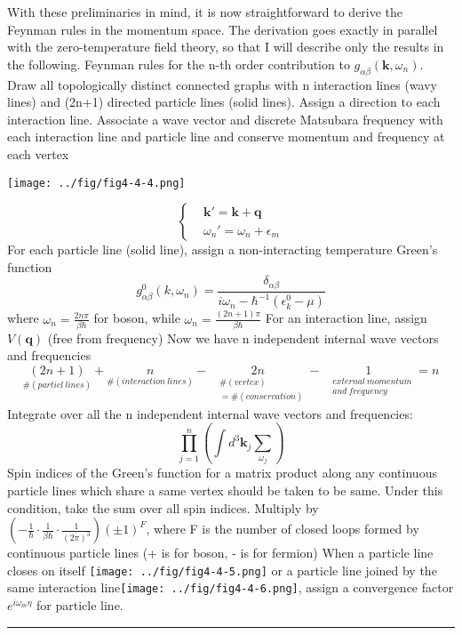 With these preliminaries in mind, it is now straightforward to derive the Feynman rules in the momentum space.
The derivation goes exactly in parallel with the zero-temperature field theory, so that I will describe only the results in the following.
Feynman rules for the n-th order contribution to $g_{\alpha\beta}(\mathbf{k},\omega_n)$.
Draw all topologically distinct connected graphs with n interaction lines (wavy lines) and (2n+1) directed particle lines (solid lines).
Assign a direction to each interaction line. Associate a wave vector and discrete Matsubara frequency with each interaction line and particle line and conserve momentum and frequency at each vertex\\
\begin{center}
\texttt{[image: ../fig/fig4-4-4.png]}
\end{center}
$$
\left\{
\begin{aligned}
&\mathbf{k}'=\mathbf{k}+\mathbf{q}\\
&\omega_n'=\omega_n+\epsilon_m
\end{aligned}
\right.
$$
For each particle line (solid line), assign a non-interacting temperature Green's function
\[
g_{\alpha\beta}^0(\mathbf{}k,\omega_n)=\frac{\delta_{\alpha\beta}}{i\omega_n-\hbar^{-1}(\epsilon_k^0-\mu)}
\]
where $\omega_n=\frac{2n\pi}{\beta\hbar}$ for boson, while $\omega_n=\frac{(2n+1)\pi}{\beta\hbar}$
For an interaction line, assign $V(\mathbf{q})$ (free from frequency)
Now we have n independent internal wave vectors and frequencies
\[
\underset{\#(particl\ lines)}{(2n+1)}+\underset{\#(interaction\ lines)}{n}-\underset{\begin{aligned}&\#(vertex)\\&=\#(conservation)\end{aligned}}{2n}-\underset{\begin{aligned}&external\ momentum\\&and\ frequency\end{aligned}}{1}=n
\]
Integrate over all the n independent internal wave vectors and frequencies:
\[
\prod_{j=1}^{n}\left(\int d^3\mathbf{k}_j\sum_{\omega_j}\right)
\]
Spin indices of the Green's function for a matrix product along any continuous particle lines which share a same vertex should be taken to be same. Under this condition, take the sum over all spin indices.
Multiply by $\left(-\frac{1}{\hbar}\cdot\frac{1}{\beta\hbar}\cdot\frac{1}{(2\pi)^3}\right)(\pm1)^F$, where F is the number of closed loops formed by continuous particle lines (+ is for boson, - is for fermion)
When a particle line closes on itself \texttt{[image: ../fig/fig4-4-5.png]} or a particle line joined by the same interaction line\texttt{[image: ../fig/fig4-4-6.png]}, assign a convergence factor $e^{i\omega_m\eta}$ for particle line.\\
\rule{\textwidth}{1mm}

